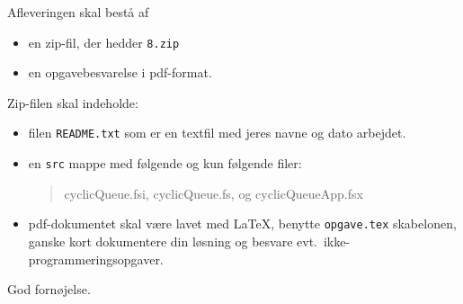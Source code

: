 \documentclass[a4paper,12pt]{article}
\newcommand{\exerciseNumber}{8}
\begin{document}
Afleveringen skal bestå af
\begin{itemize}
  \item en zip-fil, der hedder \texttt{\exerciseNumber\typeLetter.zip}
  \item en opgavebesvarelse i pdf-format.
\end{itemize}
Zip-filen skal indeholde:
\begin{itemize}
\item filen \texttt{README.txt} som er en textfil med jeres navne og dato arbejdet.
\item en \texttt{src} mappe med følgende og kun
  følgende filer:
  \begin{quote}
    cyclicQueue.fsi, cyclicQueue.fs, og cyclicQueueApp.fsx
  \end{quote}
  \item pdf-dokumentet skal være lavet med \LaTeX, benytte \lstinline[language=console]{opgave.tex} skabelonen, ganske kort dokumentere din løsning og besvare evt.\ ikke-programmeringsopgaver.
\end{itemize}

\flushright God fornøjelse.
\end{document}
